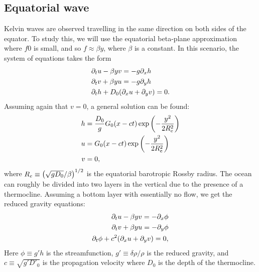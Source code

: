 \subsection{Equatorial wave}
Kelvin waves are observed travelling in the same direction on both sides of the equator. To study this, we will use the equatorial beta-plane approximation where $f0$ is small, and so $f \approx \beta y$, where $\beta$ is a constant. In this scenario, the system of equations takes the form
	\begin{align}
		&\partial_t u - \beta y v = -g\partial_x h \\
		&\partial_t v + \beta y u = -g\partial_y h \\
		&\partial_t h + D_0\qty(\partial_x u + \partial_y v) = 0.
	\end{align}
Assuming again that $v = 0$, a general solution can be found:
	\begin{align}
		h &= \frac{D_0}{g} G_0\qty(x - ct)\exp\qty(- \frac{y^2}{2R^2_e}) \\
		u &= G_0\qty(x - ct)\exp\qty(- \frac{y^2}{2R^2_e}) \\
		v &= 0,
	\end{align}
where $R_e \equiv \qty(\sqrt{gD_0} / \beta)^{1/2}$ is the equatorial barotropic Rossby radius. The ocean can roughly be divided into two layers in the vertical due to the presence of a thermocline. Assuming a bottom layer with essentially no flow, we get the reduced gravity equations:
	\begin{align}
		\partial_t u - \beta y v = -\partial_x \phi \\
		\partial_t v + \beta y u = -\partial_y \phi \\
		\partial_t \phi + c^2\qty(\partial_x u + \partial_y v) = 0,
	\end{align}
Here $\phi \equiv g' h$ is the streamfunction, $g' \equiv \delta \rho / \rho$ is the reduced gravity, and $c \equiv \sqrt{g' D'_0}$ is the propagation velocity where $D_0$ is the depth of the thermocline.